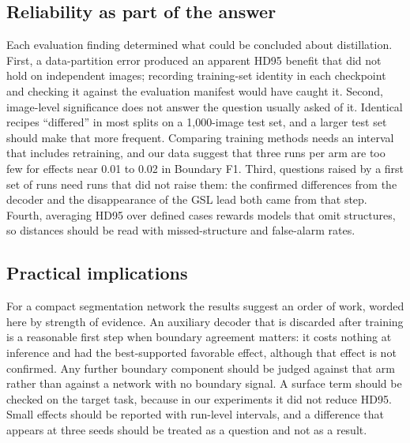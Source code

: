 \documentclass[fleqn,10pt,lineno]{wlpeerj}
\begin{document}
\subsection*{Reliability as part of the answer}
Each evaluation finding determined what could be concluded about distillation. First, a data-partition error produced an apparent HD95 benefit that did not hold on independent images; recording training-set identity in each checkpoint and checking it against the evaluation manifest would have caught it. Second, image-level significance does not answer the question usually asked of it. Identical recipes ``differed'' in most splits on a 1,000-image test set, and a larger test set should make that more frequent. Comparing training methods needs an interval that includes retraining, and our data suggest that three runs per arm are too few for effects near 0.01 to 0.02 in Boundary F1. Third, questions raised by a first set of runs need runs that did not raise them: the confirmed differences from the decoder and the disappearance of the GSL lead both came from that step. Fourth, averaging HD95 over defined cases rewards models that omit structures, so distances should be read with missed-structure and false-alarm rates.

\subsection*{Practical implications}
For a compact segmentation network the results suggest an order of work, worded here by strength of evidence. An auxiliary decoder that is discarded after training is a reasonable first step when boundary agreement matters: it costs nothing at inference and had the best-supported favorable effect, although that effect is not confirmed. Any further boundary component should be judged against that arm rather than against a network with no boundary signal. A surface term should be checked on the target task, because in our experiments it did not reduce HD95. Small effects should be reported with run-level intervals, and a difference that appears at three seeds should be treated as a question and not as a result.
\end{document}
